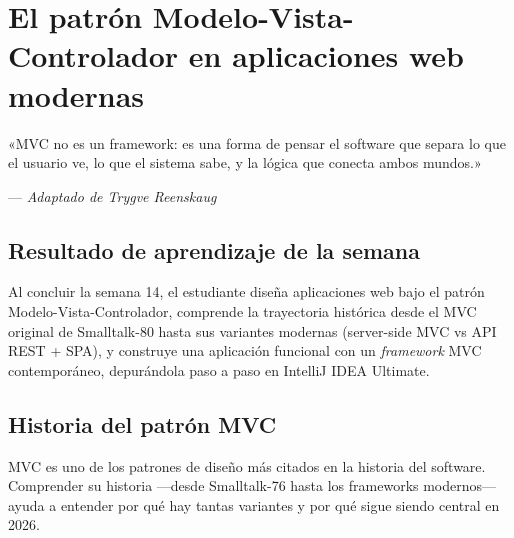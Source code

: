 \documentclass[11pt,a4paper,openany]{book}
\begin{document}
\chapter{El patrón Modelo-Vista-Controlador en aplicaciones web modernas}
\label{cap:semana14}

\epigraph{«MVC no es un framework: es una forma de pensar el software
que separa lo que el usuario ve, lo que el sistema sabe, y la lógica
que conecta ambos mundos.»}{--- \textit{Adaptado de Trygve Reenskaug}}

\section*{Resultado de aprendizaje de la semana}
Al concluir la semana 14, el estudiante diseña aplicaciones web bajo
el patrón Modelo-Vista-Controlador, comprende la trayectoria histórica
desde el MVC original de Smalltalk-80 hasta sus variantes modernas
(server-side MVC vs API REST + SPA), y construye una aplicación
funcional con un \emph{framework} MVC contemporáneo, depurándola paso
a paso en IntelliJ IDEA Ultimate.

\section{Historia del patrón MVC}

MVC es uno de los patrones de diseño más citados en la
historia del software. Comprender su historia ---desde Smalltalk-76
hasta los frameworks modernos--- ayuda a entender por qué hay tantas
variantes y por qué sigue siendo central en 2026.
\end{document}
